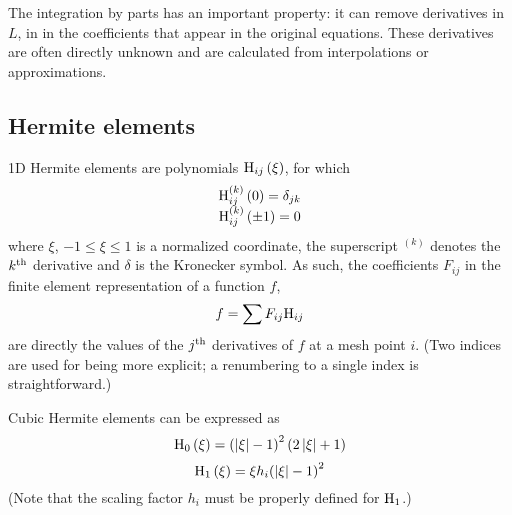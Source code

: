 The integration by parts has an important property: it can
remove derivatives in $L$, in in the coefficients that appear
in the original equations. These derivatives are often 
directly unknown and are calculated from interpolations or
approximations.

\subsection{Hermite elements} %
\label{ssub:hermite_elements}
1D Hermite elements are polynomials ${\rm H}_{ij}\left(\xi\right)$,
for which
\begin{equation}
\begin{array}{*{20}{c}}
  {{\rm H} _{ij}^{\left( k \right)}\left( 0 \right) = {\delta _{jk}}} \\ 
  {{\rm H} _{ij}^{\left( k \right)}\left( { \pm 1} \right) = 0} 
\end{array}
\end{equation}
where $\xi$, $- 1 \leqslant \xi  \leqslant 1$ is a normalized coordinate,
the superscript $^{\left( k \right)}$ denotes the $k^{\rm th}$
derivative and $\delta$ is the Kronecker symbol.
As such, the coefficients $F_{ij}$ in the finite element representation of
a function $f$,
\begin{equation}
f = \sum {{F_{ij}}{{\rm H} _{ij}}} 
\end{equation}
are directly the values of the $j^{\rm th}$
derivatives of $f$ at a mesh point $i$.
(Two indices are used for being more explicit; a renumbering
to a single index is straightforward.)

Cubic Hermite elements can be expressed as
\begin{equation}
{{\rm H}_0}\left( \xi  \right) = {\left( {\left| \xi  \right| - 1} \right)^2}\left( {2\left| \xi  \right| + 1} \right)
\end{equation}
\begin{equation}
{{\rm H}_1}\left( \xi  \right) = \xi {h_i}{\left( {\left| \xi  \right| - 1} \right)^2}
\end{equation}
(Note that the scaling factor $h_i$ must be properly defined for
${\rm H}_1$.)

